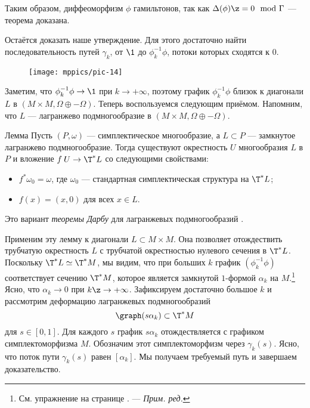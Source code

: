 Таким образом, диффеоморфизм $\phi$ гамильтонов, так как $\Delta(\phi) \z= 0 \mod{\Gamma}$  --- теорема доказана.

Остаётся доказать наше утверждение.
Для этого достаточно найти последовательность путей $\gamma_k$, от $\1$ до $\phi_k^{-1}\phi$, потоки которых сходятся к $0$.

\begin{figure}[ht!]
\centering
\texttt{[image: mppics/pic-14]}
\caption{}\label{pic-14}
\vskip0mm
\end{figure}

Заметим, что $\phi_k^{-1}\phi \to \1$ при $k \to +\infty$, поэтому график $\phi_k^{-1}\phi$ близок к диагонали $L$ в $(M \times M, \Omega \oplus -\Omega)$.
Теперь воспользуемся следующим приёмом.
Напомним, что $L$ --- лагранжево подмногообразие в $(M \times M, \Omega \oplus -\Omega)$.

\begin{thm}{Лемма}
Пусть $(P, \omega)$ --- симплектическое многообразие, а $L\subset P$ --- замкнутое лагранжево подмногообразие.
Тогда существуют окрестность $U$ многообразия $L$ в $P$ и вложение $f\: U \to \T^\ast L$ со следующими свойствами:
\begin{itemize}
\item $f^\ast\omega_0 = \omega$, где $\omega_0$ --- стандартная симплектическая структура на $\T^\ast L$;
\item $f(x) = (x,0)$ для всех $x\in L$.
\end{itemize}
\end{thm}
Это вариант \emph{теоремы Дарбу} для лагранжевых подмногообразий \cite{MS}.

Применим эту лемму к диагонали $L \subset M \times M$.
Она позволяет отождествить трубчатую окрестность $L$ с трубчатой ​​окрестностью нулевого сечения в $\T^\ast L$.
Поскольку $\T^\ast L \simeq \T^\ast M$, мы видим, что при больших $k$ график $(\phi_k^{-1}\phi)$ соответствует сечению $\T^\ast M$, которое является замкнутой $1$-формой $\alpha_k$ на $M$.\footnote{См. упражнение на странице \pageref{1-form-lagrange}. --- \textit{Прим. ред.}}
Ясно, что $\alpha_k \to 0$ при $k\z\to +\infty$.
Зафиксируем достаточно большое $k$ и рассмотрим деформацию лагранжевых подмногообразий 
\[\graph (s\alpha_k) \subset \T^\ast M\]
для $s \in [0,1]$.
Для каждого $s$ график $s\alpha_k$ отождествляется с графиком симплектоморфизма $M$.
Обозначим этот симплектоморфизм через $\gamma_k(s)$.
Ясно, что поток пути $\gamma_k(s)$ равен $[\alpha_k]$.
Мы получаем требуемый путь и завершаем доказательство.
\qeds

